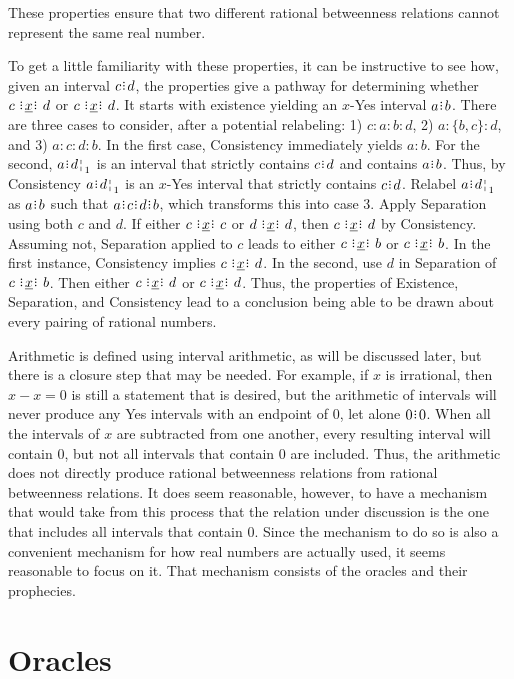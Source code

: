 \documentclass[12pt]{article}
\begin{document}
These properties ensure that two different rational betweenness relations cannot represent the same real number. 

To get a little familiarity with these properties, it can be instructive to see how, given an interval $c\rint d$, the properties give a pathway for determining whether $c \xrel d$ or \sout{$c \xrel d$}. It starts with existence yielding an $x$-Yes interval $a\rint b$. There are three cases to consider, after a potential relabeling: 1) $c:a:b:d$, 2) $a:\{b, c\}:d$, and 3) $a:c:d:b$. In the first case, Consistency immediately yields $a:b$. For the second,  $a\rint \fuzbright[1]{d}$ is an interval that strictly contains $c\rint d$ and contains $a\rint b$. Thus, by Consistency $a\rint \fuzbright[1]{d}$ is an $x$-Yes interval that strictly contains $c\rint d$. Relabel $a\rint \fuzbright[1]{d}$ as $a\rint b$ such that $a\rint c\rint d\rint b$, which transforms this into case 3. Apply Separation using both $c$ and $d$. If either $c \xrel c$ or $d \xrel d$, then $c \xrel d$ by Consistency. Assuming  not, Separation applied to $c$ leads to either \sout{$c \xrel b$} or $c \xrel b$. In the first instance, Consistency implies \sout{$c \xrel d$}. In the second, use $d$ in Separation of $c \xrel b$. Then either $c \xrel d$ or \sout{$c \xrel d$}. Thus, the properties of Existence, Separation, and Consistency lead to a conclusion being able to be drawn about every pairing of rational numbers. 


Arithmetic is defined using interval arithmetic, as will be discussed later, but there is a closure step that may be needed. For example, if $x$ is irrational, then $x - x = 0$ is still a statement that is desired, but the arithmetic of intervals will never produce any Yes intervals with an endpoint of $0$, let alone $0\rint 0$. When all the intervals of $x$ are subtracted from one another, every resulting interval will contain $0$, but not all intervals that contain 0 are included. Thus, the arithmetic does not directly produce rational betweenness relations from rational betweenness relations. It does seem reasonable, however, to have a mechanism that would take from this process that the relation under discussion is the one that includes all intervals that contain $0$. Since the mechanism to do so is also a convenient mechanism for how real numbers are actually used, it seems reasonable to focus on it. That mechanism consists of the oracles and their prophecies. 

\section{Oracles}
\end{document}
